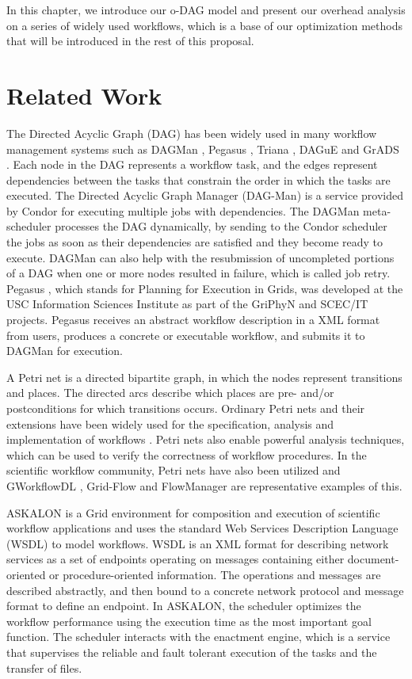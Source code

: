 In this chapter, we introduce our o-DAG model and present our overhead analysis on a series of widely used workflows, which is a base of our optimization methods that will be introduced in the rest of this proposal. 

\section{Related Work}

The Directed Acyclic Graph (DAG) has been widely used in many workflow management systems such as DAGMan \cite{DAGMan}, Pegasus \cite{Deelman2004}, Triana \cite{Taylor2006}, DAGuE \cite{Bosilca2011} and GrADS \cite{Cooper2004} . Each node in the DAG represents a workflow task, and the edges represent dependencies between the tasks that constrain the order in which the tasks are executed.  The Directed Acyclic Graph Manager (DAG-Man) \cite{DAGMan} is a service provided by Condor \cite{Frey2002} for executing multiple jobs with dependencies. The DAGMan meta-scheduler processes the DAG dynamically, by sending to the Condor scheduler the jobs as soon as their dependencies are satisfied and they become ready to execute. DAGMan can also help with the resubmission of uncompleted portions of a DAG when one or more nodes resulted in failure, which is called job retry. Pegasus \cite{Deelman2004}, which stands for Planning for Execution in Grids, was developed at the USC Information Sciences Institute as part of the GriPhyN \cite{Deelman2002} and SCEC/IT \cite{Maechling2007} projects. Pegasus receives an abstract workflow description in a XML format from users, produces a concrete or executable workflow, and submits it to DAGMan for execution. 

A Petri net is a directed bipartite graph, in which the nodes represent transitions and places. The directed arcs describe which places are pre- and/or postconditions for which transitions occurs. Ordinary Petri nets and their extensions have been widely used for the specification, analysis and implementation of workflows \cite{Aalst1998}. Petri nets also enable powerful analysis techniques, which can be used to verify the correctness of workﬂow procedures. In the scientific workflow community, Petri nets have also been utilized and GWorkflowDL \cite{Vossberg2008}, Grid-Flow \cite{Guan2004} and FlowManager \cite{Aversano2002} are representative examples of this. 

ASKALON \cite{Fahringer2005} is a Grid environment for composition and execution of scientific workflow applications and uses the standard Web Services Description Language (WSDL) to model workflows. WSDL is an XML format for describing network services as a set of endpoints operating on messages containing either document-oriented or procedure-oriented information. The operations and messages are described abstractly, and then bound to a concrete network protocol and message format to define an endpoint. In ASKALON, the scheduler optimizes the workflow performance using the execution time as the most important goal function. The scheduler interacts with the enactment engine, which is a service that supervises the reliable and fault tolerant execution of the tasks and the transfer of files. 
 
